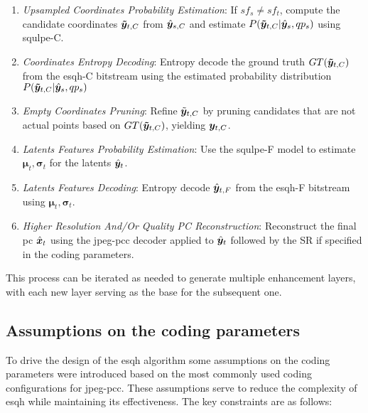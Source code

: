 \begin{enumerate}[label=D\arabic*.]
    \item \textit{Upsampled Coordinates Probability Estimation}: If $sf_s \neq sf_t$, compute the candidate coordinates $\boldsymbol{\Tilde{y}}_{t, C}$ from $\hat{\y}_{s, C}$ and estimate $P(\boldsymbol{\Tilde{y}}_{t, C}|\hat{\y}_{s}, qp_s)$ using \gls{squlpe}-C.
    \item \textit{Coordinates Entropy Decoding}: Entropy decode the ground truth $GT(\boldsymbol{\Tilde{y}}_{t, C})$ from the \gls{esqh}-C bitstream using the estimated probability distribution $P(\boldsymbol{\Tilde{y}}_{t, C}|\hat{\y}_{s}, qp_s)$ 
    \item \textit{Empty Coordinates Pruning}: Refine $\Tilde{\y}_{t,C}$ by pruning candidates that are not actual points based on $GT(\boldsymbol{\Tilde{y}}_{t, C})$, yielding $\y_{t, C}$.
    \item \textit{Latents Features Probability Estimation}: Use the \gls{squlpe}-F model to estimate $\boldsymbol{\mu}_{t}, \boldsymbol{\sigma}_{t}$ for the latents $\hat{\y}_{t}$.
    \item \textit{Latents Features Decoding}: Entropy decode $\hat{\y}_{t, F}$ from the \gls{esqh}-F bitstream using $\boldsymbol{\mu}_{t}, \boldsymbol{\sigma}_{t}$.
    \item \textit{Higher Resolution And/Or Quality PC Reconstruction}: Reconstruct the final \gls{pc} $\hat{\x}_{t}$ using the \gls{jpeg-pcc} decoder applied to $\hat{\y}_{t}$ followed by the SR if specified in the coding parameters.
\end{enumerate}

This process can be iterated as needed to generate multiple enhancement layers, with each new layer serving as the base for the subsequent one.

\subsection{Assumptions on the coding parameters}

To drive the design of the \gls{esqh} algorithm some assumptions on the coding parameters were introduced based on the most commonly used coding configurations for \gls{jpeg-pcc}. These assumptions serve to reduce the complexity of \gls{esqh} while maintaining its effectiveness. The key constraints are as follows:

